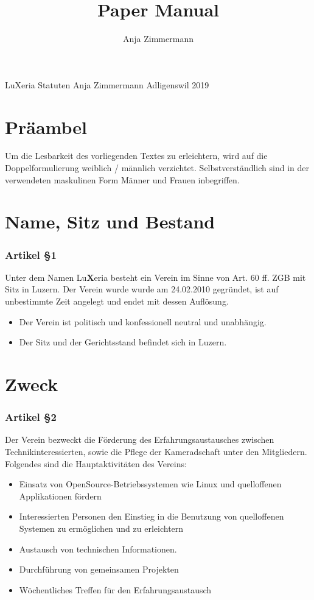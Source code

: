 \documentclass[a4paper,
               10pt,
               fleqn]{article}
\author{Anja Zimmermann}
\title{Paper Manual}
\begin{document}
         {LuXeria Statuten}                     %
         {Anja Zimmermann}   %
         {Adligenswil}                          %
         {2019}                                 %

\tableofcontents
\newpage



\section*{Präambel}
Um die Lesbarkeit des vorliegenden Textes zu
erleichtern, wird auf die Doppelformulierung weiblich /
männlich verzichtet. Selbstverständlich sind in der
verwendeten maskulinen Form Männer und Frauen inbegriffen.

\section{Name, Sitz und Bestand}

\subsubsection*{Artikel §1}
Unter dem Namen Lu\textbf{X}eria besteht ein Verein im
Sinne von Art. 60 ff. ZGB mit Sitz in Luzern. Der
Verein wurde wurde am 24.02.2010 gegründet, ist auf
unbestimmte Zeit angelegt und endet mit dessen Auflösung.
\begin{itemize}
\item Der Verein ist politisch und konfessionell neutral 
und unabhängig.
\item Der Sitz und der Gerichtsstand befindet sich in
Luzern.
\end{itemize}

\section{Zweck}

\subsubsection*{Artikel §2}
Der Verein bezweckt die Förderung des Erfahrungsaustausches 
zwischen Technikinteressierten, sowie die Pflege der
Kameradschaft unter den Mitgliedern.\newline \newline
Folgendes sind die Hauptaktivitäten des Vereins:
\begin{itemize}
\item Einsatz von OpenSource-Betriebssystemen wie Linux und
 quelloffenen Applikationen fördern
\item Interessierten Personen den Einstieg in die Benutzung 
von quelloffenen Systemen zu ermöglichen und zu erleichtern
\item Austausch von technischen Informationen.
\item Durchführung von gemeinsamen Projekten
\item Wöchentliches Treffen für den Erfahrungsaustausch
\end{itemize}
\end{document}
